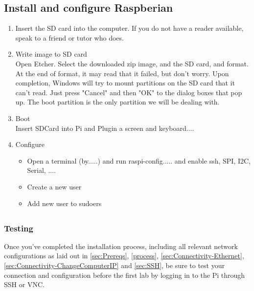\subsection{Install and configure Raspberian}
\begin{enumerate}
    \item Insert the SD card into the computer. If you do not have a reader available, speak to a friend or tutor who does.
    \item Write image to SD card\\
        Open Etcher. Select the downloaded zip image, and the SD card, and format. At the end of format, it may read that it failed,  but don't worry. Upon completion, Windows will try to mount partitions on the SD card that it can't read. Just press "Cancel" and then "OK" to the dialog boxes that pop up. The boot partition is the only partition we will be dealing with.
    \item Boot\\
    Insert SDCard into Pi and Plugin a screen and keyboard....
    \item Configure\\
    \begin{itemize}
        \item Open a terminal (by.....) and run raspi-config..... and enable ssh, SPI, I2C, Serial, ....
        \item Create a new user 
        \item Add new user to sudoers
    \end{itemize}
\end{enumerate}

\subsection{}

\subsubsection{Testing}
Once you've completed the installation process, including all relevant network configurations as laid out in \ref{sec:Prereqs}, \ref{process}, \ref{sec:Connectivity-Ethernet}, \ref{sec:Connectivity-ChangeComputerIP} and \ref{sec:SSH}, be sure to test your connection and configuration before the first lab by logging in to the Pi through SSH or VNC.
